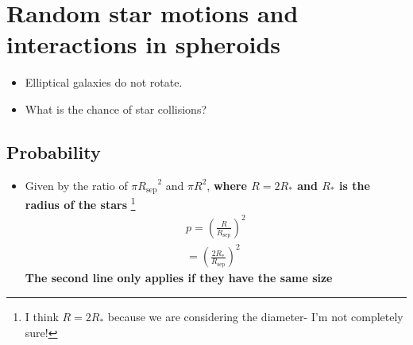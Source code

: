 \documentclass{article}
\begin{document}
\section{Random star motions and interactions in spheroids}
\begin{itemize}
\item Elliptical galaxies do not rotate.
\item What is the chance of star collisions?
\end{itemize}
\subsection{Probability}
\begin{itemize}
\item Given by the ratio of $\pi{R_\text{sep}}^2$ and $\pi R^2$, \textbf{where $R=2R_*$ and $R_*$ is the radius of the stars} \footnote{ I think $R=2R_*$ because we are considering the diameter- I'm not completely sure!}
\begin{align}
p={\left(\frac{R}{R_\text{sep}}\right)}^2\\
={\left(\frac{2R_*}{R_\text{sep}}\right)}^2 
\end{align}
\textbf{The second line only applies if they have the same size}
\end{itemize}
\end{document}

